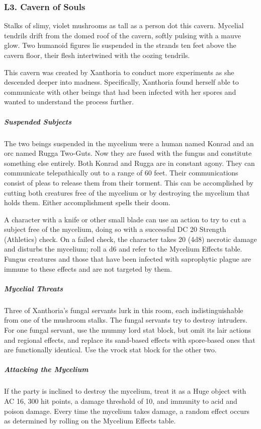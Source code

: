 \documentclass[10pt,a4paper,twoside,bg=print,twocolumn,openany,nodeprecatedcode]{dndbook}
\begin{document}
\subsubsection{L3. Cavern of Souls}
\begin{DndReadAloud}{}
Stalks of slimy, violet mushrooms as tall as a person dot this cavern. Mycelial tendrils drift from the domed roof of the cavern, softly pulsing with a mauve glow. Two humanoid figures lie suspended in the strands ten feet above the cavern floor, their flesh intertwined with the oozing tendrils.

\end{DndReadAloud}

This cavern was created by Xanthoria to conduct more experiments as she descended deeper into madness. Specifically, Xanthoria found herself able to communicate with other beings that had been infected with her spores and wanted to understand the process further.

\subparagraph{Suspended Subjects}
The two beings suspended in the mycelium were a human named Konrad and an orc named Rugga Two-Guts. Now they are fused with the fungus and constitute something else entirely. Both Konrad and Rugga are in constant agony. They can communicate telepathically out to a range of 60 feet. Their communications consist of pleas to release them from their torment. This can be accomplished by cutting both creatures free of the mycelium or by destroying the mycelium that holds them. Either accomplishment spells their doom.

A character with a knife or other small blade can use an action to try to cut a subject free of the mycelium, doing so with a successful DC 20 Strength (Athletics) check. On a failed check, the character takes 20 (4d8) necrotic damage and disturbs the mycelium; roll a d6 and refer to the Mycelium Effects table. Fungus creatures and those that have been infected with saprophytic plague are immune to these effects and are not targeted by them.

\subparagraph{Mycelial Threats}
Three of Xanthoria's fungal servants lurk in this room, each indistinguishable from one of the mushroom stalks. The fungal servants try to destroy intruders. For one fungal servant, use the mummy lord stat block, but omit its lair actions and regional effects, and replace its sand-based effects with spore-based ones that are functionally identical. Use the vrock stat block for the other two.

\subparagraph{Attacking the Mycelium}
If the party is inclined to destroy the mycelium, treat it as a Huge object with AC 16, 300 hit points, a damage threshold of 10, and immunity to acid and poison damage. Every time the mycelium takes damage, a random effect occurs as determined by rolling on the Mycelium Effects table.
\end{document}
